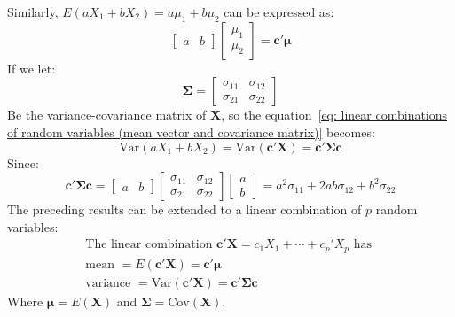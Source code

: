 \documentclass[a4paper]{article}
\newcommand{\Var}{\mathrm{Var}}
\newcommand{\Cov}{\mathrm{Cov}}
\begin{document}
    Similarly, $E\left(aX_{1} + bX_{2}\right) = a\mu_{1} + b\mu_{2}$ can be expressed as:
    \begin{equation*}
        \begin{bmatrix}
            a & b
        \end{bmatrix}
        \begin{bmatrix}
            \mu_{1} \\ \mu_{2}
        \end{bmatrix} = \mathbf{c}'\bm{\mu}
    \end{equation*}
    If we let:
    \begin{equation*}
        \bm{\Sigma} = \begin{bmatrix}
            \sigma_{11} & \sigma_{12} \\
            \sigma_{21} & \sigma_{22}
        \end{bmatrix}
    \end{equation*}
    Be the variance-covariance matrix of $\mathbf{X}$, so the equation~\ref{eq: linear combinations of random variables (mean vector and covariance matrix)} becomes:
    \begin{equation}
        \Var\left(aX_{1} + bX_{2}\right) = \Var\left(\mathbf{c}'\mathbf{X}\right) = \mathbf{c}'\bm{\Sigma}\mathbf{c}
    \end{equation}
    Since:
    \begin{equation*}
        \mathbf{c}'\bm{\Sigma}\mathbf{c} = \begin{bmatrix}
            a & b
        \end{bmatrix} \begin{bmatrix}
            \sigma_{11} & \sigma_{12} \\
            \sigma_{21} & \sigma_{22}
        \end{bmatrix}
        \begin{bmatrix}
            a \\ b
        \end{bmatrix}
        =
        a^{2}\sigma_{11} + 2 ab \sigma_{12} + b^{2}\sigma_{22}
    \end{equation*}
    The preceding results can be extended to a linear combination of $p$ random variables:
    \begin{equation}
        \begin{array}{c}
            \text{The linear combination }\mathbf{c}'\mathbf{X} = c_{1}X_{1} + \cdots + c_{p}'X_{p} \text{ has } \\
            \text{mean } = E\left(\mathbf{c}'\mathbf{X}\right) = \mathbf{c}'\bm{\mu} \\
            \text{variance } = \Var\left(\mathbf{c}'\mathbf{X}\right) = \mathbf{c}'\bm{\Sigma}\mathbf{c}
        \end{array}
    \end{equation}
    Where $\bm{\mu} = E\left(\mathbf{X}\right)$ and $\bm{\Sigma} = \Cov\left(\mathbf{X}\right)$.
\end{document}
